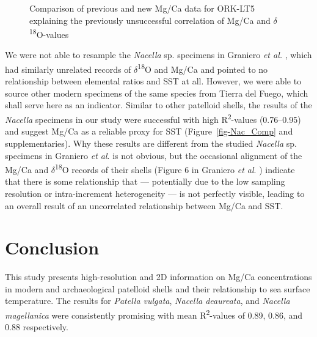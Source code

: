 \documentclass[
  authoryear,
  preprint,
  3p]{elsarticle}
\begin{document}
\begin{figure}


\caption{\label{fig-ORK_sub}Comparison of previous and new Mg/Ca data
for ORK-LT5 explaining the previously unsuccessful correlation of Mg/Ca
and \(\delta\)\textsuperscript{18}O-values}

\end{figure}%

We were not able to resample the \emph{Nacella} sp. specimens in
Graniero \emph{et al.} \citeyearpar{Graniero2017-io}, which had
similarly unrelated records of \(\delta\)\textsuperscript{18}O and Mg/Ca
and pointed to no relationship between elemental ratios and SST at all.
However, we were able to source other modern specimens of the same
species from Tierra del Fuego, which shall serve here as an indicator.
Similar to other patelloid shells, the results of the \emph{Nacella}
specimens in our study were successful with high
R\textsuperscript{2}-values (0.76--0.95) and suggest Mg/Ca as a reliable
proxy for SST (Figure~\ref{fig-Nac_Comp} and supplementaries). Why these
results are different from the studied \emph{Nacella} sp. specimens in
Graniero \emph{et al}. \citeyearpar{Graniero2017-io} is not obvious, but
the occasional alignment of the Mg/Ca and
\(\delta\)\textsuperscript{18}O records of their shells (Figure 6 in
Graniero \emph{et al}. \citeyearpar{Graniero2017-io}) indicate that
there is some relationship that --- potentially due to the low sampling
resolution or intra-increment heterogeneity --- is not perfectly
visible, leading to an overall result of an uncorrelated relationship
between Mg/Ca and SST.

\section{Conclusion}\label{conclusion}

This study presents high-resolution and 2D information on Mg/Ca
concentrations in modern and archaeological patelloid shells and their
relationship to sea surface temperature. The results for \emph{Patella
vulgata}, \emph{Nacella deaureata}, and \emph{Nacella magellanica} were
consistently promising with mean R\textsuperscript{2}-values of 0.89,
0.86, and 0.88 respectively.
\end{document}
